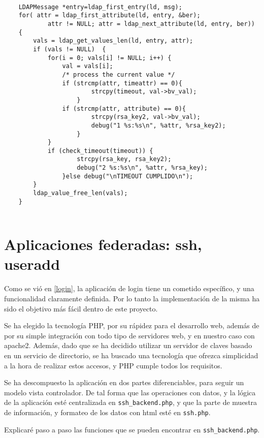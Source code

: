     \begin{lstlisting}
    
    LDAPMessage *entry=ldap_first_entry(ld, msg);
    for( attr = ldap_first_attribute(ld, entry, &ber);
            attr != NULL; attr = ldap_next_attribute(ld, entry, ber))
    {
        vals = ldap_get_values_len(ld, entry, attr);
        if (vals != NULL)  {
            for(i = 0; vals[i] != NULL; i++) {
                val = vals[i];
                /* process the current value */
                if (strcmp(attr, timeattr) == 0){
                        strcpy(timeout, val->bv_val);
                    }
                if (strcmp(attr, attribute) == 0){
                        strcpy(rsa_key2, val->bv_val);
                        debug("1 %s:%s\n", %attr, %rsa_key2);
                    }
            }
            if (check_timeout(timeout)) {
                    strcpy(rsa_key, rsa_key2);
                    debug("2 %s:%s\n", %attr, %rsa_key);
                }else debug("\nTIMEOUT CUMPLIDO\n");
        }
        ldap_value_free_len(vals);
    }


    \end{lstlisting}

    \section{Aplicaciones federadas: ssh, useradd}

    Como se vió en \ref{login}, la aplicación de login tiene un cometido
    específico, y una funcionalidad claramente definida. Por lo tanto la
    implementación de la misma ha sido el objetivo más fácil dentro de este
    proyecto.

    Se ha elegido la tecnología PHP, por su rápidez para el desarrollo web,
    además de por su simple integración con todo tipo de servidores web, y
    en nuestro caso con apache2. Además, dado que se ha decidido utilizar
    un servidor de claves basado en un servicio de directorio, se ha
    buscado una tecnología que ofrezca simplicidad a la hora de realizar
    estos accesos, y PHP cumple todos los requisitos.

    Se ha descompuesto la aplicación en dos partes diferenciables, para
    seguir un modelo vista controlador. De tal forma que las operaciones
    con datos, y la lógica de la aplicación esté centralizada en
    \texttt{ssh\_backend.php}, y que la parte de muestra de información, y
    formateo de los datos con html esté en \texttt{ssh.php}.

    Explicaré paso a paso las funciones que se pueden encontrar en
    \texttt{ssh\_backend.php}.
    
